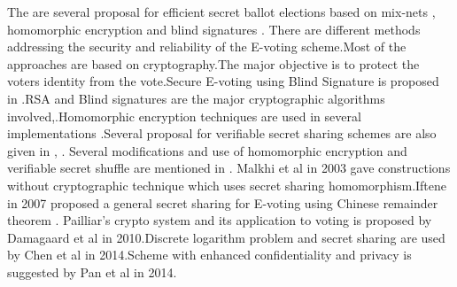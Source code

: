 \documentclass[conference]{IEEEtran}
\begin{document}
The are several proposal for efficient secret ballot elections based on mix-nets \cite{park1994efficient} \cite{sako1995receipt} \cite{jakobsson1998practical}, homomorphic encryption \cite{cohen1985robust} \cite{sako1994secure} \cite{benaloh1987verifiable} \cite{benaloh1994receipt} \cite{cramery1997secure} and blind signatures \cite{fujioka1993practical} \cite{okamoto1998receipt}.
There are different methods addressing the security and reliability of the E-voting scheme.Most of the approaches are based on cryptography.The major objective is to protect the voters identity from the vote.Secure E-voting using Blind Signature is proposed in \cite{ibrahim2003secure}.RSA \cite{rivest1978method} and Blind signatures are the major cryptographic algorithms involved\cite{camenisch1995blind},\cite{chaum1983blind}.Homomorphic encryption techniques are used in several implementations \cite{peng2005multiplicative}.Several proposal for verifiable secret sharing schemes are also given in \cite{benaloh1987verifiable},
\cite{benaloh1994receipt}.
Several modifications and use of homomorphic encryption and verifiable secret shuffle are mentioned in \cite{lee2000receipt}
\cite{hirt2000efficient} \cite{neff2001verifiable}.
Malkhi et al \cite{malkhi2003voting} in 2003 gave constructions without cryptographic technique which uses secret sharing homomorphism.Iftene \cite{iftene2007general} in 2007 proposed a general secret sharing for E-voting using Chinese remainder theorem . Pailliar's crypto system and its application to voting is proposed by Damagaard et al \cite{damgaard2010generalization} in 2010.Discrete logarithm problem and secret sharing are used by Chen et al \cite{chen2014secure} in 2014.Scheme with enhanced confidentiality and privacy is suggested by Pan et al \cite{pan2014enhanced} in 2014.
\end{document}
